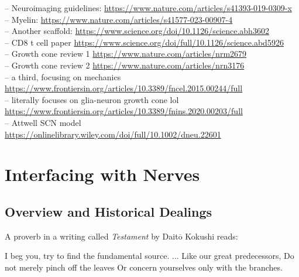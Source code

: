 -- Neuroimaging guidelines: \url{https://www.nature.com/articles/s41393-019-0309-x}\\
-- Myelin: \url{https://www.nature.com/articles/s41577-023-00907-4} \\
-- Another scaffold: \url{https://www.science.org/doi/10.1126/science.abh3602}\\
-- CD8 t cell paper \url{https://www.science.org/doi/full/10.1126/science.abd5926}\\
-- Growth cone review 1 \url{https://www.nature.com/articles/nrm2679} \\
-- Growth cone review 2 \url{https://www.nature.com/articles/nrn3176} \\
-- a third, focusing on mechanics \url{https://www.frontiersin.org/articles/10.3389/fncel.2015.00244/full} \\
-- literally focuses on glia-neuron growth cone lol \url{https://www.frontiersin.org/articles/10.3389/fnins.2020.00203/full} \\
-- Attwell SCN model \url{https://onlinelibrary.wiley.com/doi/full/10.1002/dneu.22601}

\chapter{Interfacing with Nerves}


\section{Overview and Historical Dealings}

\label{sec:HistoricalDealings}



A proverb in a writing called \textit{Testament} by Dait$\overline{\mathrm{o}}$ Kokushi reads:\newline

\hspace*{1cm} I beg you, try to find the fundamental source.\newline
\hspace*{1cm} ...\newline
\hspace*{1cm} Like our great predecessors,\newline 
\hspace*{1cm} Do not merely pinch off the leaves\newline
\hspace*{1cm} Or concern yourselves only with the branches.\newline 

